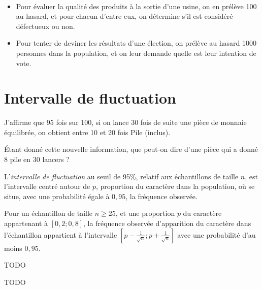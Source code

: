 \begin{exemple}~
  \begin{itemize}
    \item Pour évaluer la qualité des produits à la sortie d'une usine, on en prélève 100 au hasard, et pour chacun d'entre eux, on détermine s'il est considéré défectueux ou non.
    \item Pour tenter de deviner les résultats d'une élection, on prélève au hasard 1000 personnes dans la population, et on leur demande quelle est leur intention de vote.
  \end{itemize}
\end{exemple}

\section{Intervalle de fluctuation}

\begin{activite}
  J'affirme que 95 fois sur 100, si on lance 30 fois de suite une pièce de monnaie équilibrée, on obtient entre 10 et 20 fois Pile (inclus).

  Étant donné cette nouvelle information, que peut-on dire d'une pièce qui a donné 8 pile en 30 lancers ?
\end{activite}

\begin{definition}
  L'\emph{intervalle de fluctuation} au seuil de 95\%, relatif aux
  échantillons de taille $n$, est l’intervalle centré autour de $p$,
  proportion du caractère dans la population, où se situe, avec une
  probabilité égale à $0,95$, la fréquence observée.
\end{definition}

\begin{propriete}
  Pour un échantillon de taille $n\geq25$, et une proportion $p$ du
  caractère appartenant à $[0,2;0,8]$, la fréquence observée d'apparition du caractère dans l'échantillon appartient à l'intervalle $\left[p-\frac{1}{\sqrt{n}};p+\frac{1}{\sqrt{n}}\right]$ avec une probabilité d'au moins $0,95$.
\end{propriete}

\begin{exemple}
  TODO
\end{exemple}

\begin{exemple}
  TODO
\end{exemple}
